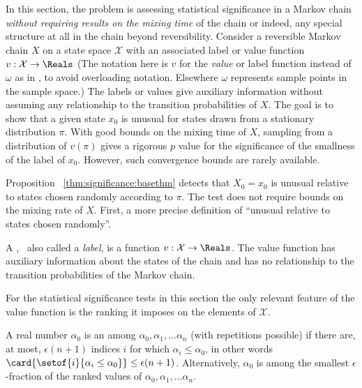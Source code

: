 \documentclass[12pt]{article}
\begin{document}
In this section, the problem is assessing statistical significance in a
Markov chain \emph{without requiring results on the mixing time} of the
chain or indeed, any special structure at all in the chain beyond
reversibility.  Consider a reversible Markov chain \( X \) on a state
space \( \mathcal{X} \) with an associated label or value function \( v
: \mathcal{X} \to \Reals \)  (The notation here is \( v \) for the
\emph{value} or label function instead of \( \omega \) as in
\cite{Chikina2860}, to avoid overloading notation.  Elsewhere \( \omega \)
represents sample points in the sample space.) The labels or values
give auxiliary information without assuming any relationship to the
transition probabilities of \( X \).  The goal is to show that a given
state \( x_0 \) is unusual for states drawn from a stationary
distribution \( \pi \).  With good bounds on the mixing time of \( X \),
sampling from a distribution of \( v(\pi) \) gives a rigorous \( p \)
value for the significance of the smallness of the label of \( x_0 \).
However, such convergence bounds are rarely available.

Proposition~%
\ref{thm:significance:basethm} detects that \( X_0 = x_0 \) is unusual
relative to states chosen randomly according to \( \pi \).  The test
does not require bounds on the mixing rate of \( X \).  First, a more
precise definition of ``unusual relative to states chosen randomly''.

\begin{definition}
    A ,~%
    also called a \emph{label}, is a function \( v :  \mathcal{X} \to
    \Reals \).  The value function has auxiliary information
    about the states of the chain and has no
    relationship to the transition probabilities of the Markov chain.
\end{definition}

\begin{remark}
    For the statistical significance tests in this section the only
    relevant feature of the value function is the ranking it imposes on
    the elements of \( \mathcal{X} \).
\end{remark}

\begin{definition}
    A real number \( \alpha_0 \) is an %
    among \( \alpha_0, \alpha_1, \dots \alpha_n \) (with repetitions
    possible) if there are, at most, \( \epsilon(n + 1) \) indices \( i \)
    for which \( \alpha_i \le \alpha_0 \), in other words \( \card{%
    \setof{i}{\alpha_i \le \alpha_0}} \le \epsilon(n+1) \).
    Alternatively, \( \alpha_0 \) is among the smallest \( \epsilon \)-fraction
    of the ranked values of \( \alpha_0, \alpha_1, \dots \alpha_n \).
\end{definition}
\end{document}
